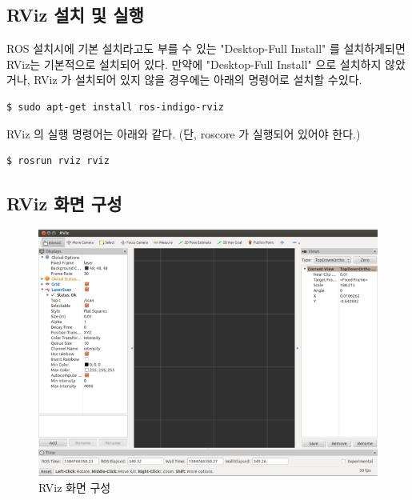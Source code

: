 \subsection{RViz 설치 및 실행}

ROS 설치시에 기본 설치라고도 부를 수 있는 "Desktop-Full Install" 를 설치하게되면 RViz는 기본적으로 설치되어 있다. 만약에 "Desktop-Full Install" 으로 설치하지 않았거나, RViz 가 설치되어 있지 않을 경우에는 아래의 명령어로 설치할 수있다.

\begin{lstlisting}[language=ROS]
$ sudo apt-get install ros-indigo-rviz
\end{lstlisting}

\noindent
RViz 의 실행 명령어는 아래와 같다. (단, roscore 가 실행되어 있어야 한다.)

\begin{lstlisting}[language=ROS]
$ rosrun rviz rviz
\end{lstlisting}

\newpage
\subsection{RViz 화면 구성}

\begin{figure}[h]
\centering\includegraphics[width=0.9\columnwidth]{pictures/chapter6/rviz.png}
\caption{RViz 화면 구성}
\end{figure}

